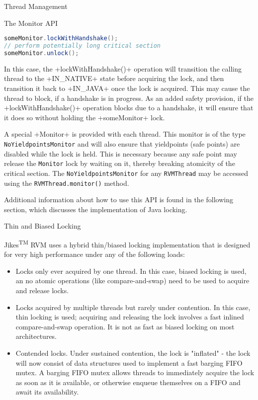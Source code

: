 \begin{section}{Thread Management}
\begin{subsection}{The Monitor API}
\begin{lstlisting}[language=Java]
someMonitor.lockWithHandshake();
// perform potentially long critical section
someMonitor.unlock();
\end{lstlisting}

In this case, the \spverb+lockWithHandshake()+ operation will transition the calling thread to the \spverb+IN_NATIVE+ state before acquiring the lock, and then transition it back to \spverb+IN_JAVA+ once the lock is acquired. This may cause the thread to block, if a handshake is in progress. As an added safety provision, if the \spverb+lockWithHandshake()+ operation blocks due to a handshake, it will ensure that it does so without holding the \spverb+someMonitor+ lock.

A special \spverb+Monitor+ is provided with each thread. This monitor is of the type \texttt{No\-Yield\-points\-Mo\-ni\-tor} and will also ensure that yieldpoints (safe points) are disabled while the lock is held. This is necessary because any safe point may release the \texttt{Monitor} lock by waiting on it, thereby breaking atomicity of the critical section. The \texttt{No\-Yield\-points\-Mo\-ni\-tor} for any \texttt{RVM\-Thread} may be accessed using the \texttt{RVM\-Thread.mo\-ni\-tor()} method.

Additional information about how to use this API is found in the following section, which discusses the implementation of Java locking.

\end{subsection}

\begin{subsection}{Thin and Biased Locking}

Jikes\textsuperscript{TM} RVM uses a hybrid thin/biased locking implementation that is designed for very high performance under any of the following loads:
\begin{itemize}
  \item Locks only ever acquired by one thread. In this case, biased locking is used, an no atomic operations (like compare-and-swap) need to be used to acquire and release locks.
  \item Locks acquired by multiple threads but rarely under contention. In this case, thin locking is used; acquiring and releasing the lock involves a fast inlined compare-and-swap operation. It is not as fast as biased locking on most architectures.
  \item Contended locks. Under sustained contention, the lock is "inflated" - the lock will now consist of data structures used to implement a fast barging FIFO mutex. A barging FIFO mutex allows threads to immediately acquire the lock as soon as it is available, or otherwise enqueue themselves on a FIFO and await its availability.
\end{itemize}


\end{subsection}
\end{section}

